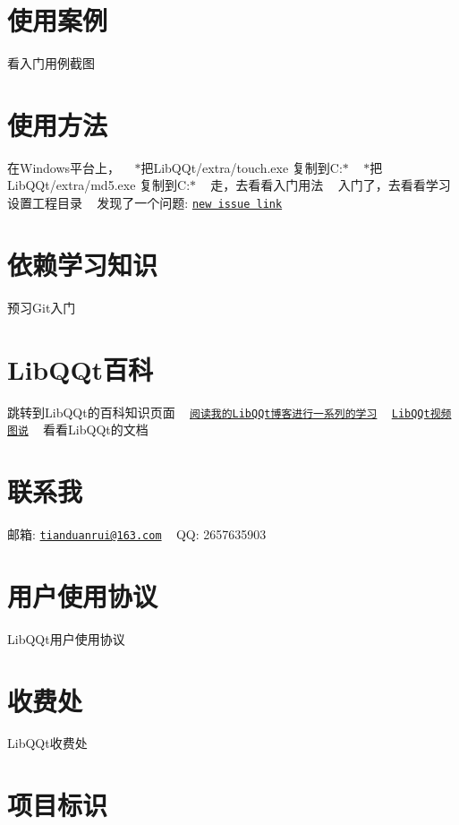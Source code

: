  \section*{使用案例}

看入门用例截图 ~\newline
 

 \section*{使用方法}

在\+Windows平台上， ~\newline
$\ast$把\+Lib\+Q\+Qt/extra/touch.exe 复制到C\+:$\ast$ ~\newline
$\ast$把\+Lib\+Q\+Qt/extra/md5.exe 复制到C\+:$\ast$ ~\newline
 走，去看看入门用法 ~\newline
入门了，去看看学习设置工程目录 ~\newline
发现了一个问题\+: \href{https://gitee.com/drabel/LibQQt/issues/new?issue%5Bassignee_id%5D=0&issue%5Bmilestone_id%5D=0}{\tt new issue link} ~\newline
 

 \section*{依赖学习知识}

预习\+Git入门 ~\newline
 

 \section*{Lib\+Q\+Qt百科}

跳转到\+Lib\+Q\+Qt的百科知识页面 ~\newline
\href{http://blog.csdn.net/Dr_Abel}{\tt 阅读我的\+Lib\+Q\+Qt博客进行一系列的学习} ~\newline
\href{http://v.youku.com/v_show/id_XMzUzODQ4MTczMg==.html?spm=a2hzp.8244740.0.0}{\tt Lib\+Q\+Qt视频图说} ~\newline
看看\+Lib\+Q\+Qt的文档 ~\newline
 

 \section*{联系我}

邮箱\+: \href{mailto:tianduanrui@163.com}{\tt tianduanrui@163.\+com} ~\newline
QQ\+: 2657635903 ~\newline
 

 \section*{用户使用协议}

Lib\+Q\+Qt用户使用协议 ~\newline
 

 \section*{收费处}

Lib\+Q\+Qt收费处 ~\newline
 

 \section*{项目标识}

 